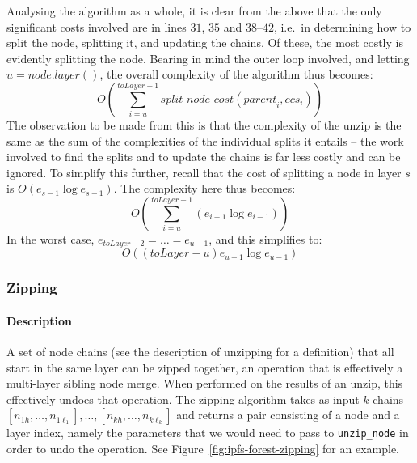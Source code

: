Analysing the algorithm as a whole, it is clear from the above that the only significant costs involved are in lines $31$, $35$ and $38$--$42$, i.e.~in determining how to split the node, splitting it, and updating the chains. Of these, the most costly is evidently splitting the node. Bearing in mind the outer loop involved, and letting $u = \mathit{node.layer()}$, the overall complexity of the algorithm thus becomes:
%
\[
O\left( \sum_{i=u}^{\mathit{toLayer} - 1} \mathit{split\_node\_cost}(\mathit{parent}_i, \mathit{ccs}_i) \right)
\]
%
The observation to be made from this is that the complexity of the unzip is the same as the sum of the complexities of the individual splits it entails -- the work involved to find the splits and to update the chains is far less costly and can be ignored. To simplify this further, recall that the cost of splitting a node in layer $s$ is $O(e_{s-1} \log e_{s-1})$. The complexity here thus becomes:
%
\[
O\left( \sum_{i=u}^{\mathit{toLayer} - 1} (e_{i-1} \log e_{i-1}) \right)
\]
%
In the worst case, $e_{\mathit{toLayer}-2} = \ldots = e_{u-1}$, and this simplifies to:
%
\[
O((toLayer-u) e_{u-1} \log e_{u-1})
\]


\afterpage{\clearpage}
\newpage

\subsubsection{Zipping}


\paragraph{Description}

A set of node chains (see the description of unzipping for a definition) that all start in the same layer can be zipped together, an operation that is effectively a multi-layer sibling node merge. When performed on the results of an unzip, this effectively undoes that operation. The zipping algorithm takes as input $k$ chains $[n_{1h},\ldots,n_{1\ell_1}], \ldots, [n_{kh},\ldots,n_{k\ell_k}]$ and returns a pair consisting of a node and a layer index, namely the parameters that we would need to pass to \texttt{unzip_node} in order to undo the operation. See Figure~\ref{fig:ipfs-forest-zipping} for an example.

